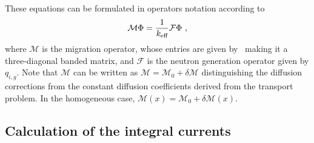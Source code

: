 These equations can be formulated in operators notation according to
\begin{equation}\label{eq:op-not}
\mathcal{M}\Phi=\frac{1}{{k_{\textrm{\scriptsize{eff}}}}}\mathcal{F}\Phi \,\, ,
\end{equation}
where $\mathcal{M}$ is the migration operator, whose entries are given by~ making it a three-diagonal banded matrix, and $\mathcal{F}$ is the neutron generation operator given by $q_{i,g}$. Note that $\mathcal{M}$ can be written as $\mathcal{M}=\mathcal{M}_0+\delta\mathcal{M}$ distinguishing the diffusion corrections from the constant diffusion coefficients derived from the transport problem. In the homogeneous case, $\mathcal{M}(x)=\mathcal{M}_0+\delta\mathcal{M}(x)$.
%
%
\subsection{Calculation of the integral currents}
\label{sec:calc-int-curr}

